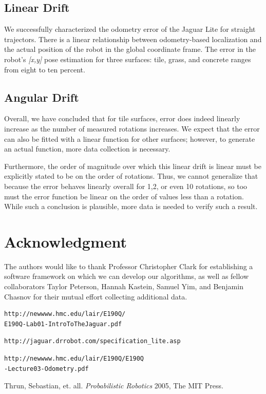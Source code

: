 \documentclass[conference]{IEEEtran}
\begin{document}
\subsection{Linear Drift}
We successfully characterized the odometry error of the Jaguar Lite for straight trajectors. There is a linear relationship between odometry-based localization and the actual position of the robot in the global coordinate frame. The error in the robot's \emph{[x,y]} pose estimation for three surfaces: tile, grass, and concrete ranges from eight to ten percent.

\subsection{Angular Drift}
Overall, we have concluded that for tile surfaces, error does indeed linearly increase as the number 
of measured rotations increases.  We expect that the error can also be fitted
with a linear function for other surfaces; however, to generate an actual function, 
more data collection is necessary. 

Furthermore, the order of magnitude over which this linear drift is linear must be
explicitly stated to be on the order of rotations.  Thus, we cannot generalize that
because the error behaves linearly overall for 1,2, or even 10 rotations, so too must 
the error function be linear on the order of values less than a rotation.  While
such a conclusion is plausible, more data is needed to verify such a result. 


\section*{Acknowledgment}


The authors would like to thank Professor Christopher Clark for 
establishing a software framework on which we can 
develop our algorithms, as well as fellow collaborators Taylor Peterson, Hannah
Kastein, Samuel Yim, and Benjamin Chasnov for their mutual effort collecting
additional data.




\begin{thebibliography}{1}

\begin{verbatim}
http://newwww.hmc.edu/lair/E190Q/
E190Q-Lab01-IntroToTheJaguar.pdf
\end{verbatim}

\begin{verbatim}
http://jaguar.drrobot.com/specification_lite.asp
\end{verbatim}

\begin{verbatim}
http://newwww.hmc.edu/lair/E190Q/E190Q
-Lecture03-Odometry.pdf
\end{verbatim}

Thrun, Sebastian, et. all. \emph{Probabilistic Robotics}
2005, The MIT Press.


\end{thebibliography}




\end{document}

